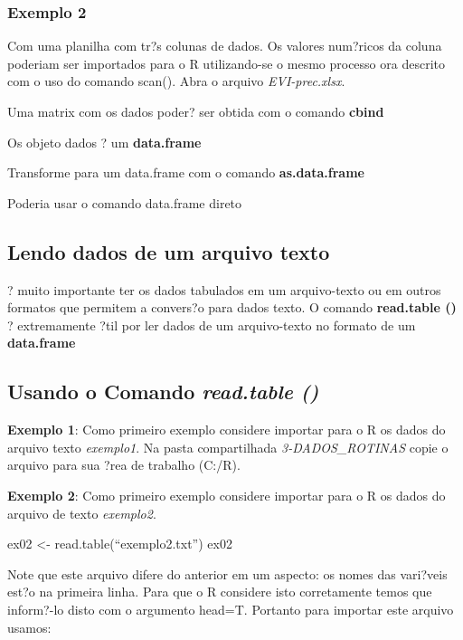 \documentclass[]{book}
\begin{document}
\hypertarget{exemplo-2}{%
\subsubsection{Exemplo 2}\label{exemplo-2}}

Com uma planilha com tr?s colunas de dados. Os valores num?ricos da coluna poderiam ser importados para o R utilizando-se o mesmo processo ora descrito com o uso do comando scan(). Abra o arquivo \emph{EVI-prec.xlsx}.

Uma matrix com os dados poder? ser obtida com o comando \textbf{cbind}

Os objeto dados ? um \textbf{data.frame}

Transforme para um data.frame com o comando \textbf{as.data.frame}

Poderia usar o comando data.frame direto

\hypertarget{lendo-dados-de-um-arquivo-texto}{%
\subsection{Lendo dados de um arquivo texto}\label{lendo-dados-de-um-arquivo-texto}}

? muito importante ter os dados tabulados em um arquivo-texto ou em outros formatos que permitem a convers?o para dados texto. O comando \textbf{read.table ()} ? extremamente ?til por ler dados de um arquivo-texto no formato de um \textbf{data.frame}

\hypertarget{usando-o-comando-read.table}{%
\subsection{\texorpdfstring{Usando o Comando \emph{read.table ()}}{Usando o Comando read.table ()}}\label{usando-o-comando-read.table}}

\textbf{Exemplo 1}: Como primeiro exemplo considere importar para o R os dados do arquivo texto \emph{exemplo1}. Na pasta compartilhada \emph{3-DADOS\_ROTINAS} copie o arquivo para sua ?rea de trabalho (C:/R).

\textbf{Exemplo 2}: Como primeiro exemplo considere importar para o R os dados do arquivo de texto \emph{exemplo2}.

ex02 \textless{}- read.table(``exemplo2.txt'')
ex02

Note que este arquivo difere do anterior em um aspecto: os nomes das vari?veis est?o na primeira linha. Para que o R considere isto corretamente temos que inform?-lo disto com o argumento head=T. Portanto para importar este arquivo usamos:
\end{document}
